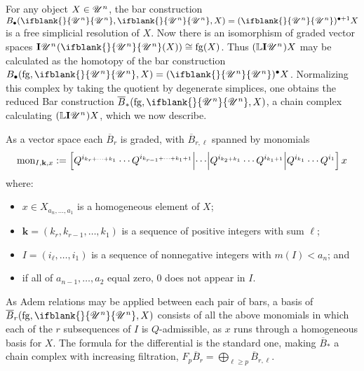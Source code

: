 \documentclass[11pt]{article}
\newcommand{\nontop}[1]{\scrU^{#1}}%
\newcommand{\Ind}[2][]{\mathbf{I}{#2}_{#1}}%
\newcommand{\forget}{\mathrm{fg}}
\newcommand{\Fr}[2][]{\ifblank{#1}{#2}{#2_{#1}}}
\newcommand{\derived}{\mathbb{L}}
\renewcommand{\Q}{Q}
\newcommand{\minDim}{m}
\newcommand{\BarMonomial}[3]{\textup{mon}_{#1,#2,#3}}
\begin{document}
\begin{KoszulComplexes2plus}
For any object $X\in\nontop{n}$, the bar construction ${B}_\bullet(\Fr{\nontop{n}},\Fr{\nontop{n}},X)=(\Fr{\nontop{n}})^{\bullet+1}X$ is a free simplicial resolution of $X$. Now there is an isomorphism of graded vector spaces $\Ind{\nontop{n}}(\Fr{\nontop{n}}(X))\cong\forget(X)$. Thus $(\derived\Ind{\nontop{n}})X$ may be calculated as the homotopy of the bar construction $B_\bullet(\forget,\Fr{\nontop{n}},X)=(\Fr{\nontop{n}})^\bullet X$. Normalizing this complex by taking the quotient by degenerate simplices, one obtains the reduced Bar construction $\overline{B}_*(\forget,\Fr{\nontop{n}},X)$, a chain complex calculating $(\derived\Ind{\nontop{n}})X$, which we now describe.
\begin{prop*}
As a vector space each $\overline{B}_r$ is graded, with $\overline{B}_{r,\ell}$
spanned by monomials
\[\BarMonomial{I}{\textbf{k}}{x}:=\left[\Q^{i_{k_r+\cdots +k_1}}\cdots \Q^{i_{k_{r-1}+\cdots +k_1+1}}
\middle|\cdots 
\middle|\Q^{i_{k_2+k_1}}\cdots \Q^{i_{k_1+1}}
\middle|\Q^{i_{k_1}}\cdots \Q^{i_1}\right]
x\]
where:
\begin{itemize}
\setlength{\parindent}{.25in}
\item $x\in X_{a_n,\ldots,a_1}$ is a homogeneous element of $X$;
\item $\textbf{k}=(k_r,k_{r-1},\ldots,k_{1})$ is a sequence of positive integers with sum $\ell$;
\item $I=(i_\ell,\ldots,i_1)$ is a sequence of nonnegative integers with $\minDim(I)<a_n$; and
\item if all of $a_{n-1},\ldots,a_2$ equal zero, $0$ does not appear in $I$.
\end{itemize}
As Adem relations may be applied between each pair of bars, a basis of $\overline{B}_r(\forget,\Fr{\nontop{n}},X)$ consists of all the above monomials in which each of the $r$ subsequences of $I$ is $\Q$-admissible, as $x$ runs through a homogeneous basis for $X$. The formula for the differential is the standard one, making %
 $\overline{B}_*$ a chain complex with increasing filtration, $F_p\overline{B}_r=\bigoplus_{\ell\geq p}\overline{B}_{r,\ell}$. 

\end{prop*}
\end{KoszulComplexes2plus}
\end{document}
